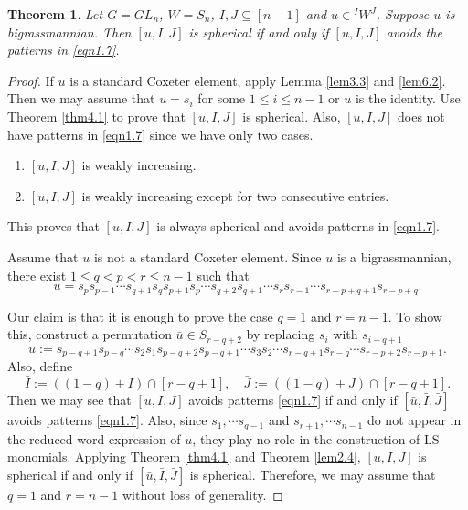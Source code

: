 \documentclass[12pt]{amsart}
\newtheorem{theorem}{Theorem}[section]
\theoremstyle{definition}
\theoremstyle{remark}
\begin{document}
\begin{theorem}\label{thm6.4}
Let $G = GL_n$, $W=S_n$, $I,J \subseteq [n-1]$ and $u \in {}^I W^J$. Suppose $u$ is bigrassmannian. Then $[u,I,J]$ is spherical if and only if $[u,I,J]$ avoids the patterns in \eqref{eqn1.7}.
\end{theorem}
\begin{proof}
If $u$ is a standard Coxeter element, apply Lemma \ref{lem3.3} and \ref{lem6.2}. Then we may assume that $u = s_i$ for some $1 \leq i \leq n-1$ or $u$ is the identity. Use Theorem \ref{thm4.1} to prove that $[u,I,J]$ is spherical. Also, $[u,I,J]$ does not have patterns in \eqref{eqn1.7} since we have only two cases.
\begin{enumerate}
\item $[u,I,J]$ is weakly increasing.
\item $[u,I,J]$ is weakly increasing except for two consecutive entries.
\end{enumerate}
This proves that $[u,I,J]$ is always spherical and avoids patterns in \eqref{eqn1.7}.

Assume that $u$ is not a standard Coxeter element. Since $u$ is a bigrassmannian, there exist $1 \leq q < p < r \leq n-1$ such that
\begin{equation}
u = s_p s_{p-1} \cdots s_{q+1} s_q s_{p+1} s_p \cdots s_{q+2} s_{q+1} \cdots s_r s_{r-1} \cdots s_{r-p+q +1} s_{r-p+q}.
\end{equation}

Our claim is that it is enough to prove the case $q=1$ and $r= n-1$. To show this, construct a permutation $\bar{u} \in S_{r-q+2}$ by replacing $s_i$ with $s_{i-q+1}$
\begin{equation}
\bar{u} := s_{p-q+1} s_{p-q} \cdots s_2 s_1 s_{p-q+2} s_{p-q+1} \cdots s_3 s_2 \cdots s_{r-q+1} s_{r-q} \cdots s_{r-p+2} s_{r-p+1}.
\end{equation}
Also, define
\begin{equation}
\bar{I} := ((1-q) + I) \cap [r-q+1], \quad \bar{J} := ((1-q) + J) \cap [r-q+1].
\end{equation}
Then we may see that $[u,I,J]$ avoids patterns \eqref{eqn1.7} if and only if $[\bar{u}, \bar{I}, \bar{J}]$ avoids patterns \eqref{eqn1.7}. Also, since $s_1 , \cdots s_{q-1}$ and $s_{r+1} , \cdots s_{n-1}$ do not appear in the reduced word expression of $u$, they play no role in the construction of LS-monomials. Applying Theorem \ref{thm4.1} and Theorem \ref{lem2.4}, $[u,I,J]$ is spherical if and only if $[\bar{u} , \bar{I}, \bar{J}]$ is spherical. Therefore, we may assume that $q=1$ and $r = n-1$ without loss of generality.


\end{proof}
\end{document}
